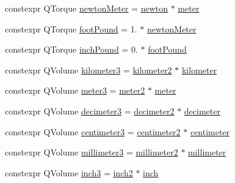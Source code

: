 \begin{DoxyCompactItemize}
\item 
constexpr Q\+Torque \mbox{\hyperlink{namespaceokapi_a3d685da47b39ff4bdf1936c2e12076ee}{newton\+Meter}} = \mbox{\hyperlink{namespaceokapi_a66d91011ac90f25dc5e518f092cc5a74}{newton}} $\ast$ \mbox{\hyperlink{namespaceokapi_a59563b3d4b18633f1c8d852e2932d1db}{meter}}
\item 
constexpr Q\+Torque \mbox{\hyperlink{namespaceokapi_a2312145f0a7f17b0a275289bfd369308}{foot\+Pound}} = 1. $\ast$ \mbox{\hyperlink{namespaceokapi_a3d685da47b39ff4bdf1936c2e12076ee}{newton\+Meter}}
\item 
constexpr Q\+Torque \mbox{\hyperlink{namespaceokapi_adbb0e6b3b23a41f9e8b971a0af1105fc}{inch\+Pound}} = 0. $\ast$ \mbox{\hyperlink{namespaceokapi_a2312145f0a7f17b0a275289bfd369308}{foot\+Pound}}
\item 
constexpr Q\+Volume \mbox{\hyperlink{namespaceokapi_a8d66a33d9f8e743e53655cffaac14059}{kilometer3}} = \mbox{\hyperlink{namespaceokapi_a9760b46c22212bb946c9936f6a600455}{kilometer2}} $\ast$ \mbox{\hyperlink{namespaceokapi_a05acd5fc8bdc7fe19d03a5241ae4bbc7}{kilometer}}
\item 
constexpr Q\+Volume \mbox{\hyperlink{namespaceokapi_af0b912fc89f2fb06960a683d9894df1f}{meter3}} = \mbox{\hyperlink{namespaceokapi_af408c7a86b7f54691246722841817248}{meter2}} $\ast$ \mbox{\hyperlink{namespaceokapi_a59563b3d4b18633f1c8d852e2932d1db}{meter}}
\item 
constexpr Q\+Volume \mbox{\hyperlink{namespaceokapi_a4f07207ec37be4257d882710d97a3de9}{decimeter3}} = \mbox{\hyperlink{namespaceokapi_a554ff440baa9c27432dcbc8068fbf47e}{decimeter2}} $\ast$ \mbox{\hyperlink{namespaceokapi_adeefe08fd5193fd9090e198b1a3463b9}{decimeter}}
\item 
constexpr Q\+Volume \mbox{\hyperlink{namespaceokapi_a2a86923c7b72c51af38c1e3771fd024c}{centimeter3}} = \mbox{\hyperlink{namespaceokapi_a9395c9d47680dc1bef1f41744f1a3a9c}{centimeter2}} $\ast$ \mbox{\hyperlink{namespaceokapi_a889129a4ecb3e93c695c8eea53b96602}{centimeter}}
\item 
constexpr Q\+Volume \mbox{\hyperlink{namespaceokapi_a517d314801b2ffaeaeaa621d6be8cbdf}{millimeter3}} = \mbox{\hyperlink{namespaceokapi_a846f4e01f428ad9bff90f8dd7f7610d8}{millimeter2}} $\ast$ \mbox{\hyperlink{namespaceokapi_a9343219094a8231c1e3bc95505ba1227}{millimeter}}
\item 
constexpr Q\+Volume \mbox{\hyperlink{namespaceokapi_ae97077d294f94936fa0261a15d7e8b9e}{inch3}} = \mbox{\hyperlink{namespaceokapi_ac232406bb408f51239ae71a3bd566a12}{inch2}} $\ast$ \mbox{\hyperlink{namespaceokapi_a7da6f1f2fa46ec3694ba3f5361bcba80}{inch}}

\end{DoxyCompactItemize}
